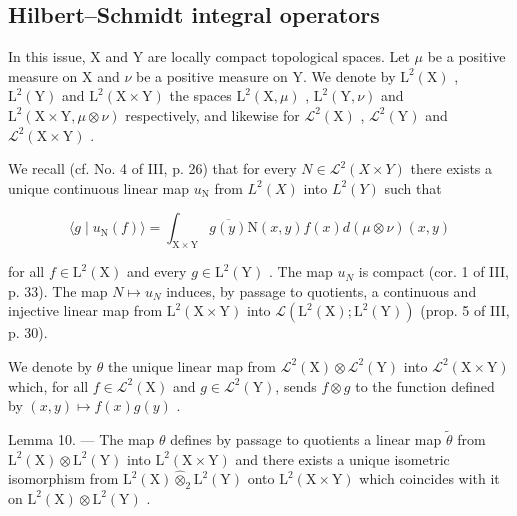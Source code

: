 \subsection{Hilbert--Schmidt integral operators}

In this issue, X and Y are locally compact topological spaces. Let \(\mu\) be a positive measure on X and \(\nu\) be a positive measure on Y. We denote by \(\mathrm{L}^{2}(\mathrm{X})\) , \(\mathrm{L}^{2}(\mathrm{Y})\) and \(\mathrm{L}^{2}(\mathrm{X} \times \mathrm{Y})\) the spaces \(\mathrm{L}^{2}(\mathrm{X}, \mu)\) , \(\mathrm{L}^{2}(\mathrm{Y}, \nu)\) and \(\mathrm{L}^{2}(\mathrm{X} \times \mathrm{Y}, \mu \otimes \nu)\) respectively, and likewise for \(\mathcal{L}^{2}(\mathrm{X})\) , \(\mathcal{L}^{2}(\mathrm{Y})\) and \(\mathcal{L}^{2}(\mathrm{X} \times \mathrm{Y})\) .

We recall (cf. No. 4 of III, p. 26) that for every \(N \in \mathcal{L}^{2}(X \times Y)\) there exists a unique continuous linear map \(u_{\mathrm{N}}\) from \(L^{2}(X)\) into \(L^{2}(Y)\) such that

\[
\langle g \mid u _ {\mathrm{N}} (f) \rangle = \int_ {\mathrm{X} \times \mathrm{Y}} \overline {{g (y)}} \mathrm{N} (x, y) f (x) d (\mu \otimes \nu) (x, y)\tag{12}
\]

for all \(f \in \mathrm{L}^{2}(\mathrm{X})\) and every \(g \in \mathrm{L}^{2}(\mathrm{Y})\) . The map \(u_{N}\) is compact (cor. 1 of III, p. 33). The map \(N \mapsto u_{N}\) induces, by passage to quotients, a continuous and injective linear map from \(\mathrm{L}^{2}(\mathrm{X} \times \mathrm{Y})\) into \(\mathcal{L}(\mathrm{L}^{2}(\mathrm{X});\mathrm{L}^{2}(\mathrm{Y}))\) (prop. 5 of III, p. 30).

We denote by \(\theta\) the unique linear map from \(\mathcal{L}^2 (\mathrm{X})\otimes \mathcal{L}^2 (\mathrm{Y})\) into \(\mathcal{L}^2 (\mathrm{X}\times \mathrm{Y})\) which, for all \(f\in \mathcal{L}^2 (\mathrm{X})\) and \(g\in \mathcal{L}^2 (\mathrm{Y})\), sends \(f\otimes g\) to the function defined by \((x,y)\mapsto f(x)g(y)\) .

Lemma 10. --- The map \(\theta\) defines by passage to quotients a linear map \(\widetilde{\theta}\) from \(\mathrm{L}^2 (\mathrm{X})\otimes \mathrm{L}^2 (\mathrm{Y})\) into \(\mathrm{L}^2 (\mathrm{X}\times \mathrm{Y})\) and there exists a unique isometric isomorphism from \(\mathrm{L}^2 (\mathrm{X})\widehat{\otimes}_2\mathrm{L}^2 (\mathrm{Y})\) onto \(\mathrm{L}^2 (\mathrm{X}\times \mathrm{Y})\) which coincides with it on \(\mathrm{L}^2 (\mathrm{X})\otimes \mathrm{L}^2 (\mathrm{Y})\) .


